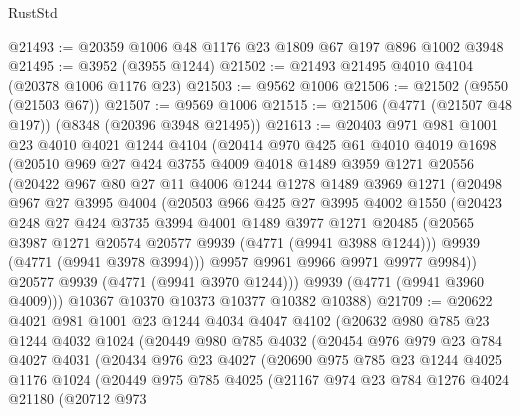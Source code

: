 \begin{lexlean}{RustStd}
\begin{coremodule}
@21493 := @20359 @1006 @48 @1176 @23 @1809 @67 @197 @896 @1002 @3948
@21495 := @3952 (@3955 @1244)
@21502 := @21493 @21495 @4010 @4104 (@20378 @1006 @1176 @23)
@21503 := @9562 @1006
@21506 := @21502 (@9550 (@21503 @67))
@21507 := @9569 @1006
@21515 := @21506 (@4771 (@21507 @48 @197)) (@8348 (@20396 @3948 @21495))
@21613 := @20403
    @971
    @981
    @1001
    @23
    @4010
    @4021
    @1244
    @4104
    (@20414
      @970
      @425
      @61
      @4010
      @4019
      @1698
      (@20510
        @969
        @27
        @424
        @3755
        @4009
        @4018
        @1489
        @3959
        @1271
        @20556
        (@20422
          @967
          @80
          @27
          @11
          @4006
          @1244
          @1278
          @1489
          @3969
          @1271
          (@20498
            @967
            @27
            @3995
            @4004
            (@20503
              @966
              @425
              @27
              @3995
              @4002
              @1550
              (@20423
                @248
                @27
                @424
                @3735
                @3994
                @4001
                @1489
                @3977
                @1271
                @20485
                (@20565 @3987 @1271 @20574 @20577 @9939 (@4771 (@9941 @3988 @1244)))
                @9939
                (@4771 (@9941 @3978 @3994)))
              @9957
              @9961
              @9966
              @9971
              @9977
              @9984))
          @20577
          @9939
          (@4771 (@9941 @3970 @1244)))
        @9939
        (@4771 (@9941 @3960 @4009)))
      @10367
      @10370
      @10373
      @10377
      @10382
      @10388)
@21709 := @20622
    @4021
    @981
    @1001
    @23
    @1244
    @4034
    @4047
    @4102
    (@20632
      @980
      @785
      @23
      @1244
      @4032
      @1024
      (@20449
        @980
        @785
        @4032
        (@20454
          @976
          @979
          @23
          @784
          @4027
          @4031
          (@20434
            @976
            @23
            @4027
            (@20690
              @975
              @785
              @23
              @1244
              @4025
              @1176
              @1024
              (@20449
                @975
                @785
                @4025
                (@21167
                  @974
                  @23
                  @784
                  @1276
                  @4024
                  @21180
                  (@20712
                    @973

\end{coremodule}
\end{lexlean}
